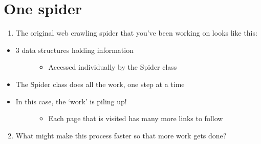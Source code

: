 \documentclass[letterpaper,10pt,openany,oneside]{sphinxmanual}
\begin{document}
\section{One spider}
\label{URLSpider/URLSpider:one-spider}\begin{enumerate}
\item {} 
The original web crawling spider that you’ve been working on looks like this:

\end{enumerate}
\begin{itemize}
\item {} \begin{description}
\item[{3 data structures holding information}] \leavevmode\begin{itemize}
\item {} 
Accessed individually by the Spider class

\end{itemize}

\end{description}

\item {} 
The Spider class does all the work, one step at a time

\item {} \begin{description}
\item[{In this case, the ‘work’ is piling up!}] \leavevmode\begin{itemize}
\item {} 
Each page that is visited has many more links to follow

\end{itemize}

\end{description}

\end{itemize}
\begin{enumerate}
\setcounter{enumi}{1}
\item {} 
What might make this process faster so that more work gets done?

\end{enumerate}
\end{document}

